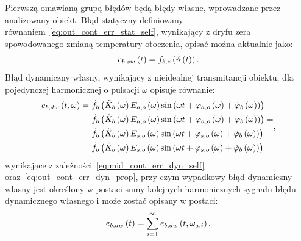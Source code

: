 Pierwszą omawianą grupą błędów będą błędy własne, wprowadzane przez analizowany obiekt. Błąd statyczny definiowany równaniem~\eqref{eq:out_cont_err_stat_self}, wynikający z dryfu zera spowodowanego zmianą temperatury otoczenia, opisać można aktualnie jako:
\begin{equation}
e_{b,sw} \left(t\right) = f_{b,z} \left( \vartheta \left(t\right) \right) \label{eq:sym_partb_err_sw}.
\end{equation}
Błąd dynamiczny własny, wynikający z nieidealnej transmitancji obiektu, dla pojedynczej harmonicznej o pulsacji $\omega$ opisuje równanie:
\begin{equation}
\begin{split}
e_{b,dw} \left(t,\omega\right) =~
& \dot{f}_{b} \left( \tilde{K}_{b} \left(\omega\right) E_{a,o} \left(\omega\right) \sin \left( \omega t + \varphi_{a,o} \left(\omega\right) + \tilde{\varphi}_{b} \left(\omega\right) \right) \right)- \\
& \dot{f}_{b} \left( \dot{K}_{b} \left(\omega\right) E_{a,o} \left(\omega\right) \sin \left( \omega t + \varphi_{a,o} \left(\omega\right) + \dot{\varphi}_{b} \left(\omega\right) \right) \right) = \\
& \dot{f}_{b} \left( \tilde{K}_{b} \left(\omega\right) E_{s,o} \left(\omega\right) \sin \left( \omega t + \varphi_{s,o} \left(\omega\right) + \tilde{\varphi}_{b} \left(\omega\right) \right) \right) - \\
& \dot{f}_{b} \left( \dot{K}_{b} \left(\omega\right) E_{s,o} \left(\omega\right) \sin \left( \omega t + \varphi_{s,o} \left(\omega\right) + \dot{\varphi}_{b} \left(\omega\right) \right) \right)
\end{split}
\label{eq:sym_partb_dyn_self_err},
\end{equation}
wynikające z zależności~\eqref{eq:mid_cont_err_dyn_self} oraz~\eqref{eq:out_cont_err_dyn_prop}, przy czym wypadkowy błąd dynamiczny własny jest określony w postaci sumy kolejnych harmonicznych sygnału błędu dynamicznego własnego i może zostać opisany w postaci:
\begin{equation}
e_{b,dw} \left(t\right) = \sum _{i = 1} ^{\infty} e_{b,dw} \left(t,\omega_{a,i}\right) \label{eq:sym_partb_dyn_self_sum}.
\end{equation}

